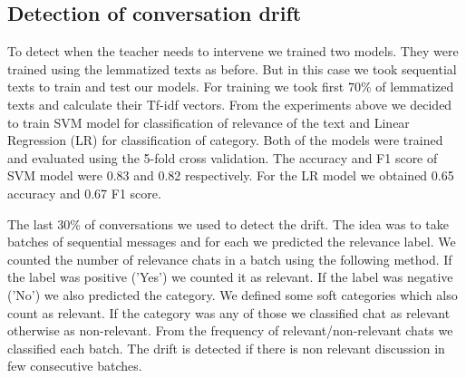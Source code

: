 \documentclass[11pt,a4paper]{article}
\begin{document}
\subsection{Detection of conversation drift}
To detect when the teacher needs to intervene we trained two models.
They were trained using the lemmatized texts as before.
But in this case we took sequential texts to train and test our models.
For training we took first 70\% of lemmatized texts and calculate their Tf-idf vectors.
From the experiments above we decided to train SVM model for classification of relevance of the text and Linear Regression (LR) for classification of category.
Both of the models were trained and evaluated using the 5-fold cross validation.
The accuracy and F1 score of SVM model were 0.83 and 0.82 respectively.
For the LR model we obtained 0.65 accuracy and 0.67 F1 score.

The last 30\% of conversations we used to detect the drift.
The idea was to take batches of sequential messages and for each we predicted the relevance label.
We counted the number of relevance chats in a batch using the following method.
If the label was positive ('Yes') we counted it as relevant.
If the label was negative ('No') we also predicted the category.
We defined some soft categories which also count as relevant.
If the category was any of those we classified chat as relevant otherwise as non-relevant.
From the frequency of relevant/non-relevant chats we classified each batch.
The drift is detected if there is non relevant discussion in few consecutive batches.
\end{document}
